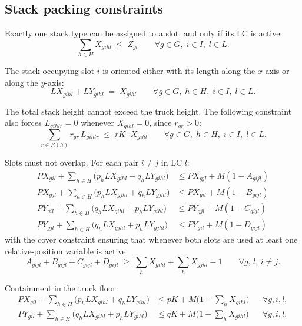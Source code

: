 \subsection*{Stack packing constraints}

Exactly one stack type can be assigned to a slot, and only if its LC
is active:
\begin{equation}
\sum_{h\in H} X_{gihl}\;\le\;Z_{gl}
\qquad \forall g\in G,\; i\in I,\; l\in L.
\label{sb:eq:slot-active}
\end{equation}

The stack occupying slot $i$ is oriented either with its length along
the $x$-axis or along the $y$-axis:
\begin{equation}
LX_{gihl}+LY_{gihl}\;=\;X_{gihl}
\qquad \forall g\in G,\; h\in H,\; i\in I,\; l\in L.
\label{sb:eq:orient}
\end{equation}

The total stack height cannot exceed the truck height. The following
constraint also forces $L_{gihlr}=0$ whenever $X_{gihl}=0$, since
$r_{gr}>0$:
\begin{equation}
\sum_{r\in R(h)} r_{gr}\,L_{gihlr}\;\le\;rK\cdot X_{gihl}
\qquad \forall g\in G,\; h\in H,\; i\in I,\; l\in L.
\label{sb:eq:height}
\end{equation}

Slots must not overlap. For each pair $i\ne j$ in LC $l$:
\begin{align}
PX_{gil}+\sum_{h\in H}\bigl(p_{h}LX_{gihl}+q_{h}LY_{gihl}\bigr)
    &\le PX_{gjl}+M(1-A_{gijl})
    \label{sb:eq:nonov-x1}\\
PX_{gjl}+\sum_{h\in H}\bigl(p_{h}LX_{gjhl}+q_{h}LY_{gjhl}\bigr)
    &\le PX_{gil}+M(1-B_{gijl})
    \label{sb:eq:nonov-x2}\\
PY_{gil}+\sum_{h\in H}\bigl(q_{h}LX_{gihl}+p_{h}LY_{gihl}\bigr)
    &\le PY_{gjl}+M(1-C_{gijl})
    \label{sb:eq:nonov-y1}\\
PY_{gjl}+\sum_{h\in H}\bigl(q_{h}LX_{gjhl}+p_{h}LY_{gjhl}\bigr)
    &\le PY_{gil}+M(1-D_{gijl})
    \label{sb:eq:nonov-y2}
\end{align}
with the cover constraint ensuring that whenever both slots are used
at least one relative-position variable is active:
\begin{equation}
A_{gijl}+B_{gijl}+C_{gijl}+D_{gijl}
\;\ge\;\sum_{h}X_{gihl}+\sum_{h}X_{gjhl}-1
\qquad \forall g,\,l,\,i\ne j.
\label{sb:eq:cover}
\end{equation}

Containment in the truck floor:
\begin{align}
PX_{gil}+\sum_{h\in H}\bigl(p_{h}LX_{gihl}+q_{h}LY_{gihl}\bigr)
    &\le pK+M\bigl(1-\textstyle\sum_{h} X_{gihl}\bigr)
    &&\forall g,i,l,
    \label{sb:eq:cont-x}\\
PY_{gil}+\sum_{h\in H}\bigl(q_{h}LX_{gihl}+p_{h}LY_{gihl}\bigr)
    &\le qK+M\bigl(1-\textstyle\sum_{h} X_{gihl}\bigr)
    &&\forall g,i,l.
    \label{sb:eq:cont-y}
\end{align}

